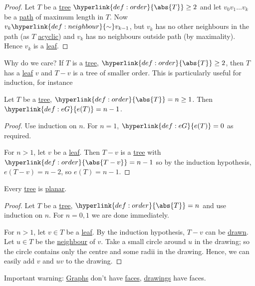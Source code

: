 \documentclass{article}
\begin{document}
\begin{proof}
    Let $T$ be a \hyperlink{def:tree}{tree} $\hyperlink{def:order}{\abs{T}} \geq 2$ and let $v_0 v_1 \dotsc v_k$ be a \hyperlink{def:path}{path} of maximum length in $T$.
    Now $v_k \hyperlink{def:neighbour}{\sim} v_{k-1}$, but $v_k$ has no other neighbours in the path (as $T$ \hyperlink{def:cycle}{acyclic}) and $v_k$ has no neighbours outside path (by maximality).
    Hence $v_k$ is a \hyperlink{def:leaf}{leaf}.
\end{proof}

Why do we care? If $T$ is a \hyperlink{def:tree}{tree}, $\hyperlink{def:order}{\abs{T}} \geq 2$, then $T$ has a \hyperlink{def:leaf}{leaf} $v$ and $T-v$ is a tree of smaller order.
This is particularly useful for induction, for instance

\begin{nprop}\label{prop:21}
    Let $T$ be a \hyperlink{def:tree}{tree}, $\hyperlink{def:order}{\abs{T}} = n \geq 1$. Then $\hyperlink{def:eG}{e(T)} = n-1$.
\end{nprop}

\begin{proof}
    Use induction on $n$. For $n=1$, $\hyperlink{def:eG}{e(T)} = 0$ as required.

    For $n > 1$, let $v$ be a \hyperlink{def:leaf}{leaf}.
    Then $T - v$ is a \hyperlink{def:tree}{tree} with $\hyperlink{def:order}{\abs{T - v}} = n-1$ so by the induction hypothesis, $e(T-v) = n-2$, so $e(T) = n-1$.
\end{proof}

\begin{nprop}\label{prop:22}
    Every \hyperlink{def:tree}{tree} is \hyperlink{def:drawing}{planar}.
\end{nprop}

\begin{proof}
    Let $T$ be a \hyperlink{def:tree}{tree}, $\hyperlink{def:order}{\abs{T}} = n$ and use induction on $n$.
    For $n=0,1$ we are done immediately.

    For $n > 1$, let $v \in T$ be a \hyperlink{def:leaf}{leaf}.
    By the induction hypothesis, $T-v$ can be \hyperlink{def:drawing}{drawn}.
    Let $u \in T$ be the \hyperlink{def:neighbour}{neighbour} of $v$.
    Take a small circle around $u$ in the drawing; so the circle contains only the centre and some radii in the drawing.
    Hence, we can easily add $v$ and $uv$ to the drawing.
\end{proof}

\begin{remark}
    Important warning: \hyperlink{def:graph}{Graphs} don't have \hyperlink{def:face}{faces}, \hyperlink{def:drawing}{drawings} have faces.
\end{remark}
\end{document}
